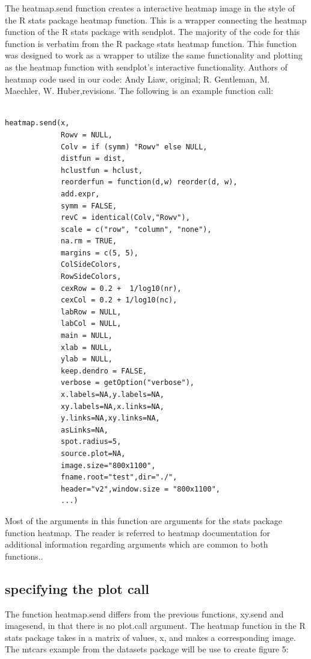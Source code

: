 \documentclass[]{article}
\begin{document}
The heatmap.send function creates a interactive heatmap image in the style of the R stats package heatmap function. This is a wrapper connecting the heatmap function of the R stats package with sendplot. The majority of the code for this function is verbatim from the R package stats heatmap function. This function was designed to work as a wrapper to utilize the same functionality and plotting as the heatmap function with sendplot's interactive functionality. Authors of heatmap code used in our code: Andy Liaw, original; R. Gentleman, M. Maechler, W. Huber,revisions. The following is an example function call: 


\begin{verbatim}

heatmap.send(x,
             Rowv = NULL,
             Colv = if (symm) "Rowv" else NULL, 
             distfun = dist,
             hclustfun = hclust,
             reorderfun = function(d,w) reorder(d, w),
             add.expr,
             symm = FALSE,
             revC = identical(Colv,"Rowv"),
             scale = c("row", "column", "none"),
             na.rm = TRUE, 
             margins = c(5, 5),
             ColSideColors,
             RowSideColors,
             cexRow = 0.2 +  1/log10(nr),
             cexCol = 0.2 + 1/log10(nc),
             labRow = NULL, 
             labCol = NULL,
             main = NULL,
             xlab = NULL,
             ylab = NULL,
             keep.dendro = FALSE, 
             verbose = getOption("verbose"),
             x.labels=NA,y.labels=NA,
             xy.labels=NA,x.links=NA,
             y.links=NA,xy.links=NA,
             asLinks=NA,
             spot.radius=5,
             source.plot=NA,
             image.size="800x1100",
             fname.root="test",dir="./",
             header="v2",window.size = "800x1100", 
             ...) 
\end{verbatim}


 Most of the arguments in this function are arguments for the stats package function heatmap. The reader is referred to heatmap documentation for additional information regarding arguments which are common to both functions.. \newline



\subsection{specifying the plot call}

The function heatmap.send differs from the previous functions, xy.send and imagesend, in that there is no plot.call argument. The heatmap function in the R stats package takes in a matrix of values, x,  and makes a corresponding image. The mtcars example from the datasets package will be use to create figure 5:  
\end{document}
